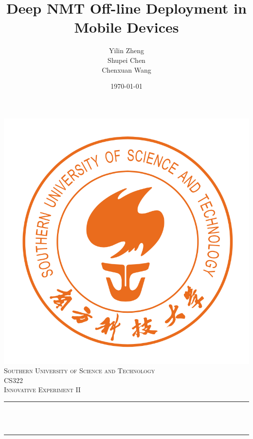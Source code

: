 \documentclass[a4paper, 12pt]{article}
\title{\Large Deep NMT Off-line Deployment in Mobile Devices}     %
\author{Yilin Zheng\\Shupei Chen\\Chenxuan Wang}                               %
\date{\today}                                           %
\makeatletter
\let\thetitle\@title
\makeatother
\begin{document}
\begin{titlepage}
    \centering
    \vspace*{0.5 cm}
    \includegraphics[scale = 0.4]{sustech_logo.png}\\[1.0 cm]   %
    \textsc{\Large Southern University of Science and Technology}\\[1.5 cm]   %
    \textsc{\Large CS322}\\[0.5 cm]               %
    \textsc{\large Innovative Experiment II}\\[0.5 cm]               %
    \rule{\linewidth}{0.2 mm} \\[0.5 cm]
    { \huge \bfseries \thetitle}\\
    \rule{\linewidth}{0.2 mm} \\[1.5 cm]
    

\end{titlepage}
\end{document}
